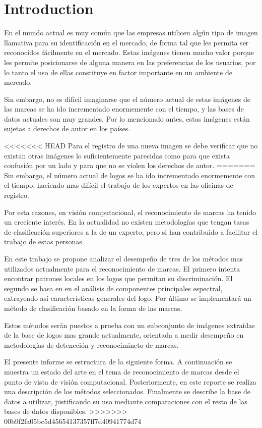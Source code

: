 \documentclass[conference]{IEEEtran}
\begin{document}
\section{Introduction}
En el mundo actual es muy común que las empresas utilicen algún tipo de imagen llamativa para su identificación en el mercado, de forma tal que les permita ser reconocidos fácilmente en el mercado. Estas imágenes tienen mucho valor porque les permite posicionarse de alguna manera en las preferencias de los usuarios, por lo tanto el uso de ellas constituye en factor importante en un ambiente de mercado.

Sin embargo, no es difícil imaginarse que el número actual de estas imágenes de las marcas se ha ido incrementado enormemente con el tiempo, y las bases de datos actuales son muy grandes. Por lo mencionado antes, estas imágenes están sujetas a derechos de autor en los países.

<<<<<<< HEAD
Para el registro de una nueva imagen se debe verificar que no existan otras imágenes lo suficientemente parecidas como para que exista confusión por un lado y para que no se violen los derechos de autor. 
=======
Sin embargo, el número actual de logos se ha ido incrementado enormemente con el tiempo, haciendo mas difícil el trabajo de los expertos en las oficinas de registro. 

Por esta razones, en visión computacional, el reconocimiento de marcas ha tenido un creciente interés. En la actualidad no existen metodologías que tengan tasas de clasificación superiores a la de un experto, pero si han contribuido a facilitar el trabajo de estas personas.

En este trabajo se propone analizar el desempeño de tres de los métodos mas utilizados actualmente para el reconocimiento de marcas. El primero intenta encontrar patrones locales en los logos que permitan su discriminación. El segundo se basa en en el análisis de componentes principales espectral, extrayendo así características generales del logo. Por último se implementará un método de clasificación basado en la forma de las marcas.

Estos métodos serán puestos a prueba con un subconjunto de imágenes extraídas de la base de logos mas grande actualmente, orientada a medir desempeño en metodologías de detencción y reconocimineto de marcas.

El presente informe se estructura de la siguiente forma. A continuación se muestra un estado del arte en el tema de reconocimiento de marcas desde el punto de vista de visión computacional. Posteriormente, en este reporte se realiza una descripción de los métodos seleccionados. Finalmente se describe la base de datos a utilizar, justificando su uso mediante comparaciones con el resto de las bases de datos disponibles.
>>>>>>> 00b9f2fa05bc5d45654137357ff7d40941774d74
\end{document}
